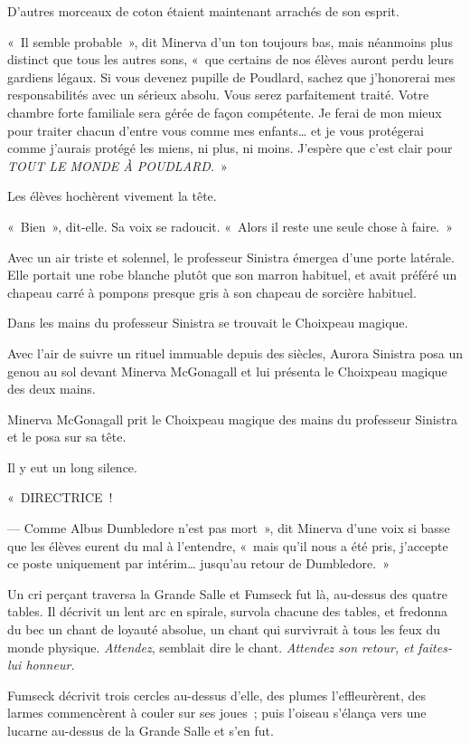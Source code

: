 D'autres morceaux de coton étaient maintenant arrachés de son esprit.

«~Il semble probable~», dit Minerva d'un ton toujours bas, mais néanmoins plus distinct que tous les autres sons, «~que certains de nos élèves auront perdu leurs gardiens légaux. Si vous devenez pupille de Poudlard, sachez que j'honorerai mes responsabilités avec un sérieux absolu. Vous serez parfaitement traité. Votre chambre forte familiale sera gérée de façon compétente. Je ferai de mon mieux pour traiter chacun d'entre vous comme mes enfants… et je vous protégerai comme j'aurais protégé les miens, ni plus, ni moins. J'espère que c'est clair pour \emph{TOUT LE MONDE À POUDLARD.}~»

Les élèves hochèrent vivement la tête.

«~Bien~», dit-elle. Sa voix se radoucit. «~Alors il reste une seule chose à faire.~»

Avec un air triste et solennel, le professeur Sinistra émergea d'une porte latérale. Elle portait une robe blanche plutôt que son marron habituel, et avait préféré un chapeau carré à pompons presque gris à son chapeau de sorcière habituel.

Dans les mains du professeur Sinistra se trouvait le Choixpeau magique.

Avec l'air de suivre un rituel immuable depuis des siècles, Aurora Sinistra posa un genou au sol devant Minerva McGonagall et lui présenta le Choixpeau magique des deux mains.

Minerva McGonagall prit le Choixpeau magique des mains du professeur Sinistra et le posa sur sa tête.

Il y eut un long silence.

«~DIRECTRICE~!

--- Comme Albus Dumbledore n'est pas mort~», dit Minerva d'une voix si basse que les élèves eurent du mal à l'entendre, «~mais qu'il nous a été pris, j'accepte ce poste uniquement par intérim… jusqu'au retour de Dumbledore.~»

Un cri perçant traversa la Grande Salle et Fumseck fut là, au-dessus des quatre tables. Il décrivit un lent arc en spirale, survola chacune des tables, et fredonna du bec un chant de loyauté absolue, un chant qui survivrait à tous les feux du monde physique. \emph{Attendez}, semblait dire le chant. \emph{Attendez son retour, et faites-lui honneur.}

Fumseck décrivit trois cercles au-dessus d'elle, des plumes l'effleurèrent, des larmes commencèrent à couler sur ses joues~; puis l'oiseau s'élança vers une lucarne au-dessus de la Grande Salle et s'en fut.
